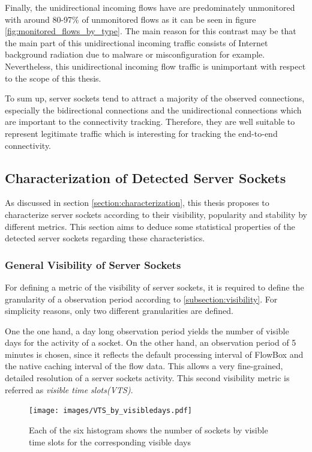 Finally, the unidirectional incoming flows have are predominately unmonitored with around 80-97\% of unmonitored flows as it can be seen in figure \ref{fig:monitored_flows_by_type}. 
The main reason for this contrast may be that the main part of this unidirectional incoming traffic consists of Internet background radiation \citep{Wustrow10,Pang04} due to malware or misconfiguration for example. 
Nevertheless, this unidirectional incoming flow traffic is unimportant with respect to the scope of this thesis.

To sum up, \glspl{server socket} tend to attract a majority of the observed connections, especially the bidirectional connections and the unidirectional connections which are important to the connectivity tracking. 
Therefore, they are well suitable to represent legitimate traffic which is interesting for tracking the end-to-end connectivity.

\newpage 
\subsection{Characterization of Detected Server Sockets}

As discussed in section \ref{section:characterization}, this thesis proposes to characterize \glspl{server socket} according to their visibility, popularity and stability by different metrics. This section aims to deduce some statistical properties of the detected \glspl{server socket} regarding these characteristics.

\subsubsection{General Visibility of Server Sockets}

For defining a metric of the visibility of \glspl{server socket}, it is required to define the granularity of a observation period according to \ref{subsection:visibility}. For simplicity reasons, only two different granularities are defined.

One the one hand, a day long observation period yields the number of visible days for the activity of a socket. 
On the other hand, an observation period of 5 minutes is chosen, since it reflects the default processing interval of FlowBox and the native caching interval of the flow data. 
This allows a very fine-grained, detailed resolution of a \glspl{server socket} activity. 
This second visibility metric is referred as \emph{visible time slots(VTS)}.
\begin{figure}
	[hb] \centering 
	\texttt{[image: images/VTS\_by\_visibledays.pdf]} \caption{Each of the six histogram shows the number of sockets by visible time slots for the corresponding visible days} 
	\label{fig:vts_by_visibledays} 
\end{figure}

